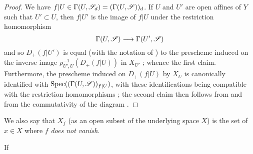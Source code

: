 \begin{proof}
We have $f|U\in\Gamma(U,\mathscr{S}_d)=(\Gamma(U,\mathscr{S}))_d$.
If $U$ and $U'$ are open affines of $Y$ such that $U'\subset U$, then $f|U'$ is the image of $f|U$ under the restriction homomorphism
\[
  \Gamma(U,\sh{S}) \to \Gamma(U',\sh{S})
\]
and so $D_+(f|U')$ is equal (with the notation of ) to the prescheme induced on the inverse image $\rho_{U',U}^{-1}(D_+(f|U))$ in $X_{U'}$ ;
whence the first claim.
Furthermore, the prescheme induced on $D_+(f|U)$ by $X_U$ is canonically identified with $\operatorname{Spec}((\Gamma(U,\mathscr{S}))_{f|U})$, with these identifications being compatible with the restriction homomorphisms ;
the second claim then follows from  and from the commutativity of the diagram .
\end{proof}

We also say that $X_f$ (as an open subset of the underlying space $X$) is the set of $x\in X$ where $f$ \emph{does not vanish}.

\begin{corollary}[3.1.5]
\label{II.3.1.5}
If
\end{corollary}














